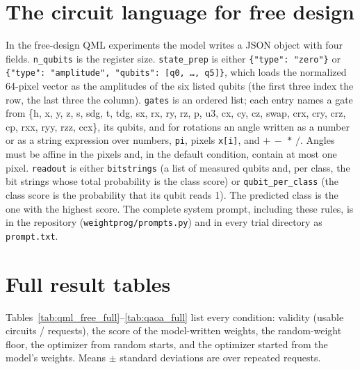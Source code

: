 \section{The circuit language for free design}
\label{app:dsl}

In the free-design QML experiments the model writes a JSON object with four fields. \texttt{n\_qubits} is the register size. \texttt{state\_prep} is either \texttt{\{"type": "zero"\}} or \texttt{\{"type": "amplitude", "qubits": [q0, \ldots, q5]\}}, which loads the normalized 64-pixel vector as the amplitudes of the six listed qubits (the first three index the row, the last three the column). \texttt{gates} is an ordered list; each entry names a gate from \{h, x, y, z, s, sdg, t, tdg, sx, rx, ry, rz, p, u3, cx, cy, cz, swap, crx, cry, crz, cp, rxx, ryy, rzz, ccx\}, its qubits, and for rotations an angle written as a number or as a string expression over numbers, \texttt{pi}, pixels \texttt{x[i]}, and $+\,-\,*\,/$. Angles must be affine in the pixels and, in the default condition, contain at most one pixel. \texttt{readout} is either \texttt{bitstrings} (a list of measured qubits and, per class, the bit strings whose total probability is the class score) or \texttt{qubit\_per\_class} (the class score is the probability that its qubit reads 1). The predicted class is the one with the highest score. The complete system prompt, including these rules, is in the repository (\texttt{weightprog/prompts.py}) and in every trial directory as \texttt{prompt.txt}.

\section{Full result tables}
\label{app:tables}

Tables~\ref{tab:qml_free_full}--\ref{tab:qaoa_full} list every condition: validity (usable circuits / requests), the score of the model-written weights, the random-weight floor, the optimizer from random starts, and the optimizer started from the model's weights. Means $\pm$ standard deviations are over repeated requests.

\begin{table}[h]
\centering\footnotesize
\resizebox{\linewidth}{!}{}
\caption{Free-design QML, test accuracy.}
\label{tab:qml_free_full}
\end{table}

\begin{table}[h]
\centering\footnotesize
\resizebox{\linewidth}{!}{}
\caption{Fixed-ansatz QML, test accuracy.}
\label{tab:qml_fixed_full}
\end{table}

\begin{table}[h]
\centering\footnotesize
\resizebox{\linewidth}{!}{}
\caption{VQE, fraction of the spectrum captured ($1$ = exact ground state).}
\label{tab:vqe_full}
\end{table}

\begin{table}[h]
\centering\footnotesize
\resizebox{\linewidth}{!}{}
\caption{QAOA MaxCut, approximation ratio.}
\label{tab:qaoa_full}
\end{table}
